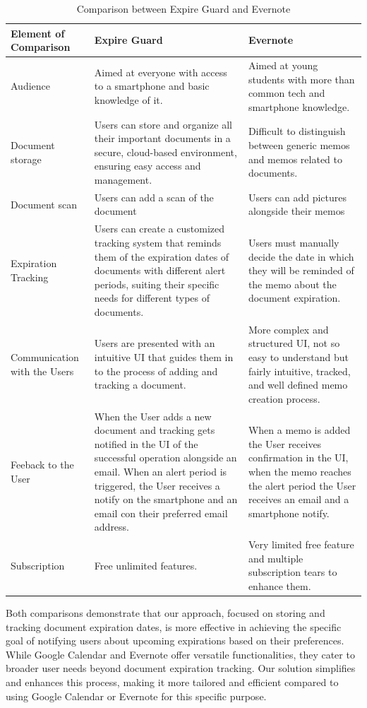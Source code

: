 \begin{table}[H]
	
	\begin{tabularx}{\textwidth}{|X|X|X|}
		\hline
		\textbf{Element of Comparison} & \textbf{Expire Guard} & \textbf{Evernote} \\
		\hline
		Audience  & Aimed at everyone with access to a smartphone and basic knowledge of it. & Aimed at young students with more than common tech and smartphone knowledge.
		
		\\
		\hline
		Document storage & Users can store and organize all their important documents in a secure, cloud-based environment, ensuring easy access and management. & Difficult to distinguish between generic memos and memos related to documents. \\
		\hline
		Document scan & Users can add a scan of the document & Users can add pictures alongside their memos \\
		\hline
		Expiration Tracking & Users can create a customized tracking system that reminds them of the expiration dates of documents with different alert periods, suiting their specific needs for different types of documents. & Users must manually decide the date in which they will be reminded of the memo about the document expiration. \\
		\hline
		Communication with the Users& Users are presented with an intuitive UI that guides them in to the process of adding and tracking a document. & More complex and structured UI, not so easy to understand but fairly intuitive, tracked, and well defined memo creation process. \\
		\hline
		Feeback to the User& When the User adds a new document and tracking gets notified in the UI of the successful operation alongside an email. When an alert period is triggered, the User receives a notify on the smartphone and an email con their preferred email address. & When a memo is added the User receives confirmation in the UI, when the memo reaches the alert period the User receives an email and a smartphone notify. \\
		\hline
		Subscription  & Free unlimited features. & Very limited free feature and multiple subscription tears to enhance them. \\
		\hline
	\end{tabularx}
	\caption{Comparison between Expire Guard and Evernote}
\end{table}
\noindent
Both comparisons demonstrate that our approach, focused on storing and tracking document expiration dates, is more effective in achieving the specific goal of notifying users about upcoming expirations based on their preferences. While Google Calendar and Evernote offer versatile functionalities, they cater to broader user needs beyond document expiration tracking. Our solution simplifies and enhances this process, making it more tailored and efficient compared to using Google Calendar or Evernote for this specific purpose.\\
